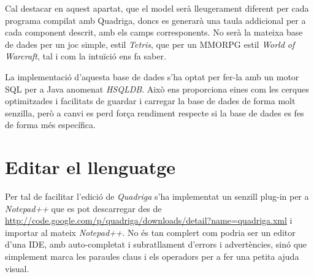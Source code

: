   Cal destacar en aquest apartat, que el model serà lleugerament diferent per cada programa compilat amb Quadriga, doncs es generarà una taula addicional per a cada component descrit, amb els camps corresponents. No serà la mateixa base de dades per un joc simple, estil {\em Tetris}, que per un MMORPG estil {\em World of Warcraft}, tal i com la intuïció ens fa saber.
  
  La implementació d'aquesta base de dades s'ha optat per fer-la amb un motor SQL per a Java anomenat {\em HSQLDB}. Això ens proporciona eines com les cerques optimitzades i facilitats de guardar i carregar la base de dades de forma molt senzilla, però a canvi es perd força rendiment respecte si la base de dades es fes de forma més específica.

\section{Editar el llenguatge}

  Per tal de facilitar l'edició de {\em Quadriga} s'ha implementat un senzill plug-in per a {\em Notepad++} que es pot descarregar des de \url{http://code.google.com/p/quadriga/downloads/detail?name=quadriga.xml} i importar al mateix {\em Notepad++}. No és tan complert com podria ser un editor d'una IDE, amb auto-completat i subratllament d'errors i advertències, sinó que simplement marca les paraules claus i els operadors per a fer una petita ajuda visual.